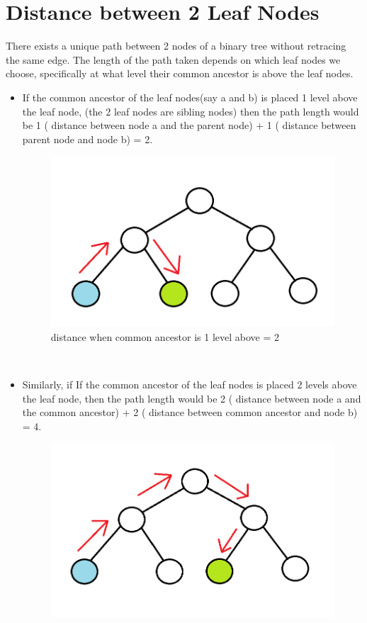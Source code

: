 \documentclass[journal,12pt,twocolumn]{IEEEtran}
\begin{document}
\section{Distance between 2 Leaf Nodes}

There exists a unique path between 2 nodes of a binary tree without retracing the same edge. The length of the path taken depends on which leaf nodes we choose, specifically at what level their common ancestor is above the leaf nodes. 
\\
\begin{itemize}
    \item If the common ancestor of the leaf nodes(say a and b) is placed 1 level above the leaf node, (the 2 leaf nodes are sibling nodes) then the path length would be 1 ( distance between node a and the parent node) + 1 ( distance between parent node and node b) = 2.
    \begin{figure}[!h]
        \centering
        \includegraphics[scale = 0.3]{treea.png}
        \caption{distance when common ancestor is 1 level above = 2}
        \label{fig:2}
    \end{figure}
    \\
    \item Similarly, if If the common ancestor of the leaf nodes is placed 2 levels above the leaf node, then the path length would be 2 ( distance between node a and the common ancestor) + 2 ( distance between common ancestor and node b) = 4.
    \begin{figure}[!h]
        \centering
        \includegraphics[scale = 0.3]{treeeb.png}

\end{figure}
\end{itemize}
\end{document}
